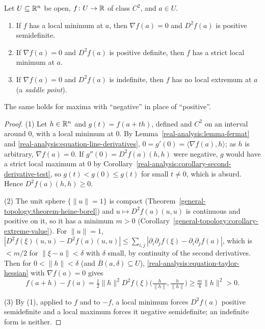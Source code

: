 \begin{proposition}\label{real-analysis:proposition-hessian-test}
Let $U \subseteq \mathbb{R}^n$ be open, $f \colon U \to \mathbb{R}$ of class $C^2$, and $a \in U$.
\begin{enumerate}
\item If $f$ has a local minimum at $a$, then $\nabla f(a) = 0$ and $D^2f(a)$ is positive semidefinite.
\item If $\nabla f(a) = 0$ and $D^2f(a)$ is positive definite, then $f$ has a strict local minimum at $a$.
\item If $\nabla f(a) = 0$ and $D^2f(a)$ is indefinite, then $f$ has no local extremum at $a$ (a \emph{saddle point}).
\end{enumerate}
The same holds for maxima with ``negative'' in place of ``positive''.
\end{proposition}

\begin{proof}
(1) Let $h \in \mathbb{R}^n$ and $g(t) = f(a + th)$, defined and $C^2$ on an interval around $0$, with a local minimum at $0$. By Lemma~\ref{real-analysis:lemma-fermat} and
\eqref{real-analysis:equation-line-derivatives}, $0 = g'(0) = \langle\nabla f(a), h\rangle$; as $h$ is arbitrary, $\nabla f(a) = 0$. If $g''(0) = D^2f(a)(h, h)$ were negative, $g$ would have a strict local
maximum at $0$ by Corollary~\ref{real-analysis:corollary-second-derivative-test}, so $g(t) < g(0) \leq g(t)$ for small $t \neq 0$, which is absurd. Hence $D^2f(a)(h, h) \geq 0$.

(2) The unit sphere $\{\|u\| = 1\}$ is compact (Theorem~\ref{general-topology:theorem-heine-borel}) and $u \mapsto D^2f(a)(u, u)$ is continuous and positive on it, so it has a minimum $m > 0$
(Corollary~\ref{general-topology:corollary-extreme-value}). For $\|u\| = 1$,
$|D^2f(\xi)(u, u) - D^2f(a)(u, u)| \leq \sum_{i,j}|\partial_i\partial_jf(\xi) - \partial_i\partial_jf(a)|$, which is $< m/2$ for $\|\xi - a\| < \delta$ with $\delta$ small, by continuity of the second
derivatives. Then for $0 < \|h\| < \delta$ (and $\overline{B}(a, \delta) \subseteq U$), \eqref{real-analysis:equation-taylor-hessian} with $\nabla f(a) = 0$ gives
\[
f(a + h) - f(a) = \tfrac12\|h\|^2D^2f(\xi)\bigl(\tfrac{h}{\|h\|}, \tfrac{h}{\|h\|}\bigr) \geq \tfrac{m}{4}\|h\|^2 > 0.
\]

(3) By (1), applied to $f$ and to $-f$, a local minimum forces $D^2f(a)$ positive semidefinite and a local maximum forces it negative semidefinite; an indefinite form is neither.
\end{proof}

